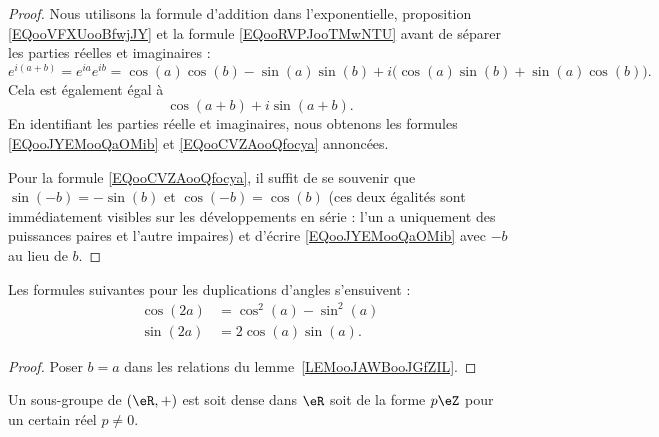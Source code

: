 \begin{proof}
    Nous utilisons la formule d'addition dans l'exponentielle, proposition \eqref{EQooVFXUooBfwjJY} et la formule \eqref{EQooRVPJooTMwNTU} avant de séparer les parties réelles et imaginaires :
    \begin{equation}
        e^{i(a+b)}= e^{ia} e^{ib}=\cos(a)\cos(b)-\sin(a)\sin(b)+i\big( \cos(a)\sin(b)+\sin(a)\cos(b) \big).
    \end{equation}
    Cela est également égal à
    \begin{equation}
        \cos(a+b)+i\sin(a+b).
    \end{equation}
    En identifiant les parties réelle et imaginaires, nous obtenons les formules \eqref{EQooJYEMooQaOMib} et \eqref{EQooCVZAooQfocya} annoncées.

    Pour la formule \eqref{EQooCVZAooQfocya}, il suffit de se souvenir que \( \sin(-b)=-\sin(b)\) et \( \cos(-b)=\cos(b)\) (ces deux égalités sont immédiatement visibles sur les développements en série : l'un a uniquement des puissances paires et l'autre impaires) et d'écrire \eqref{EQooJYEMooQaOMib} avec \( -b\) au lieu de \( b\).
\end{proof}

\begin{corollary}       \label{CORooQZDQooWjMXTF}
    Les formules suivantes pour les duplications d'angles s'ensuivent :
    \begin{subequations}
        \begin{align}
            \cos(2a)&=\cos^2(a)-\sin^2(a)\\
            \sin(2a)&=2\cos(a)\sin(a).      \label{SUBEQooLRJDooQuFvux}
        \end{align}
    \end{subequations}
\end{corollary}

\begin{proof}
    Poser \( b=a\) dans les relations du lemme~\ref{LEMooJAWBooJGfZIL}.
\end{proof}

\begin{lemma}       \label{LEMooPQWWooMdPWUT}
    Un sous-groupe de \( (\eR,+)\) est soit dense dans \( \eR\) soit de la forme \( p\eZ\) pour un certain réel \( p\neq 0\).
\end{lemma}

